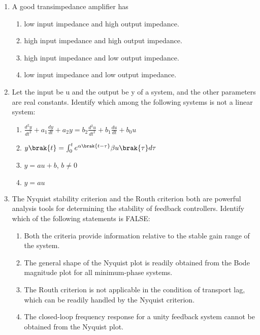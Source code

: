 \documentclass[a4paper, 11pt]{article}
\begin{document}
\begin{enumerate}
    \hfill{}

    \item A good transimpedance amplifier has
    \begin{enumerate}
        \item low input impedance and high output impedance.
        \item high input impedance and high output impedance.
        \item high input impedance and low output impedance.
        \item low input impedance and low output impedance.
    \end{enumerate}

    \hfill{}

    \item Let the input be u and the output be y of a system, and the other parameters are real constants. Identify which among the following systems is not a linear system:
    \begin{enumerate}
        \item $\frac{d^2y}{dt^2} + a_1\frac{dy}{dt} + a_2y = b_2\frac{d^2u}{dt^2} + b_1\frac{du}{dt} + b_0u$ 
        \item $y\brak{t} = \int_{0}^{t} e^{\alpha\brak{t-\tau}} \beta u\brak{\tau} d\tau$
        \item $y = au + b$, $b \ne 0$
        \item $y = au$
    \end{enumerate}

    \hfill{}

    \item The Nyquist stability criterion and the Routh criterion both are powerful analysis tools for determining the stability of feedback controllers. Identify which of the following statements is FALSE:
    \begin{enumerate}
        \item Both the criteria provide information relative to the stable gain range of the system.
        \item The general shape of the Nyquist plot is readily obtained from the Bode magnitude plot for all minimum-phase systems.
        \item The Routh criterion is not applicable in the condition of transport lag, which can be readily handled by the Nyquist criterion.
        \item The closed-loop frequency response for a unity feedback system cannot be obtained from the Nyquist plot.
    \end{enumerate}


\end{enumerate}
\end{document}
